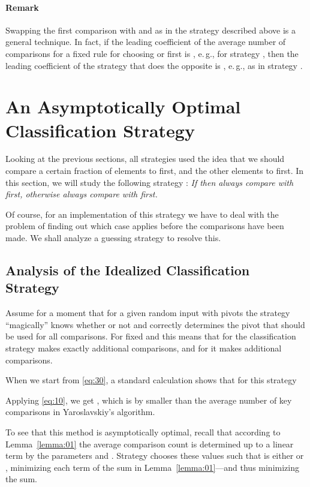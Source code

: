 \documentclass[prodmode,acmtalg]{acmsmall}
\begin{document}
\paragraph{Remark} Swapping the first comparison with  and  as in the strategy described above is a
general technique. In fact, if the
leading coefficient of the average number of comparisons for a fixed rule 
for choosing  or  first is , e.\,g.,  for strategy
,  then the leading coefficient of the strategy that
does the opposite is , e.\,g.,  as in
strategy .



\section{An Asymptotically Optimal Classification Strategy}\label{sec:decreasing}
Looking at the previous sections, all strategies used the idea that we should
compare a certain fraction of elements to  first, and the other
elements to  first. In this section, we
will study the following strategy : \emph{If  then always compare with  first, otherwise always compare with 
first.} 

Of course, for an implementation of this strategy we have to deal with the
problem of finding out which case applies before the comparisons have been made.
We shall analyze a guessing strategy to resolve this. 

    \subsection{Analysis of the Idealized Classification Strategy}\label{sec:optimal:strategy}
 Assume for a moment that for a given random input with pivots  the
 strategy ``magically'' knows whether
  or not and correctly determines the pivot that should be used for all
 comparisons. For fixed  and  this means that for  the
 classification strategy makes exactly  additional comparisons, and for  it
 makes  additional comparisons.

 When we start from \eqref{eq:30}, 
 a standard calculation shows that for this strategy
 
 Applying \eqref{eq:10}, we get
,
which is by  smaller than the average number of key
comparisons in Yaroslavskiy's algorithm.

To see that this method is asymptotically optimal, 
recall that according to
Lemma~\ref{lemma:01} 
the average comparison count is determined up to a linear term by
the parameters  and
.
Strategy  chooses these values such that  is
either  or , minimizing each term of the sum in
Lemma~\ref{lemma:01}---and thus minimizing the sum.
\end{document}
